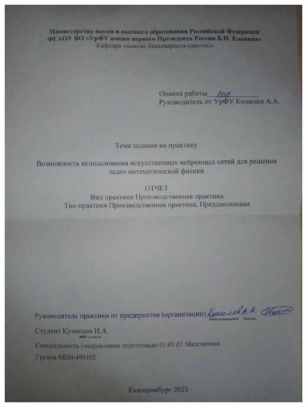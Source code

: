 \documentclass[a4paper,14pt]{extarticle} %
\author{Кузнецов Игорь}
\title{}
\date{\today}
\begin{document}
\newcommand{\brv}[1]{{\left| #1 \right|}}
\newcommand{\brr}[1]{{\left( #1 \right)}}
\newcommand{\brs}[1]{{\left[ #1 \right]}}
\newcommand{\brc}[1]{{\left\{ #1 \right\}}}
\newcommand{\brn}[1]{{\left\lVert #1 \right\rVert}}
\newcommand{\bra}[1]{{\left\langle #1 \right\rangle}}
\newcommand{\brrl}[1]{{\left( #1 \right]}}
            \newcommand{\brrr}[1]{{\left[ #1 \right)}}
\newcommand{\under}[2]{{\underset{#2}{\underbrace{#1}}}}
\newcommand{\strm}[1]{\underset{#1}{\rightarrow}}
% 

% 
\includegraphics[width=\textwidth]{титульник.jpg}
\thispagestyle{empty}

\newpage
\tableofcontents
\newpage

% 
\end{document}
